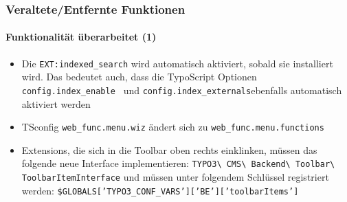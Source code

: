 \begin{frame}[fragile]
	\frametitle{Veraltete/Entfernte Funktionen}
	\framesubtitle{Funktionalität überarbeitet (1)}

	\begin{itemize}

		\item Die \texttt{EXT:indexed\_search} wird automatisch aktiviert, sobald sie installiert wird.
			Das bedeutet auch, dass die TypoScript Optionen \small\texttt{config.index\_enable }\normalsize
			und \small\texttt{config.index\_externals}\normalsize\space ebenfalls automatisch aktiviert werden

		\item TSconfig \small\texttt{web\_func.menu.wiz}\normalsize\space
			ändert sich zu \small\texttt{web\_func.menu.functions}\normalsize

		\item Extensions, die sich in die Toolbar oben rechts einklinken, müssen das folgende neue Interface implementieren:
			\small
				\texttt{TYPO3\textbackslash
					CMS\textbackslash
					Backend\textbackslash
					Toolbar\textbackslash
					ToolbarItemInterface}
			\normalsize\newline
			und müssen unter folgendem Schlüssel registriert werden:
			\small
				\texttt{\$GLOBALS['TYPO3\_CONF\_VARS']['BE']['toolbarItems']}
			\normalsize

	\end{itemize}

\end{frame}


